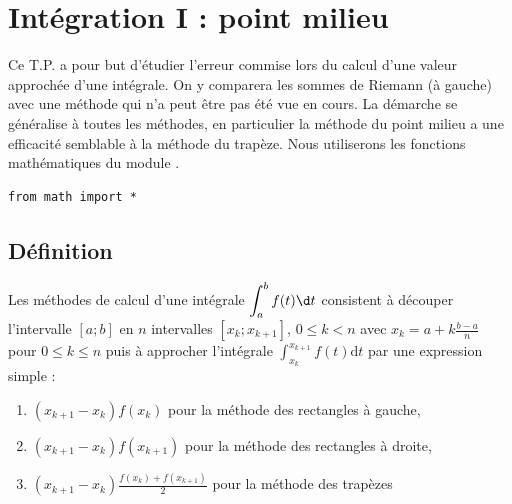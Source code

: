\chapter{Intégration I : point milieu}
\thispagestyle{empty}
{\sf Ce T.P. a pour but d'étudier l'erreur commise lors du calcul d'une valeur approchée d'une intégrale. On y comparera les sommes de Riemann (à gauche) avec une méthode qui n'a peut être pas été vue en cours. La démarche se généralise à toutes les méthodes, en particulier la méthode du point milieu a une efficacité semblable à la méthode du trapèze. 
Nous utiliserons les fonctions mathématiques du module .
\begin{lstlisting}
from math import *
\end{lstlisting}
}
\section{Définition}
Les méthodes de calcul d'une intégrale $\displaystyle \int_a^b f(t) \d t$ consistent à découper l'intervalle $[a;b]$ en $n$ intervalles $[x_{k}; x_{k+1}]$, $0\le k < n$ avec $ x_k = a + k\frac{b-a}n$ pour $0\le k\le n$ puis à approcher l'intégrale $\displaystyle \int_{x_k}^{x_{k+1}} f(t) \text{d}t$ par une expression simple :
\begin{enumerate}
    \item $(x_{k+1} -x_k)f(x_k)$ pour la méthode des rectangles à gauche,
    \item $(x_{k+1} -x_k)f(x_{k+1})$ pour la méthode des rectangles à droite,
    \item $\displaystyle (x_{k+1} -x_k)\frac{f(x_k)+f(x_{k+1})}2$ pour la méthode des trapèzes
\end{enumerate}

